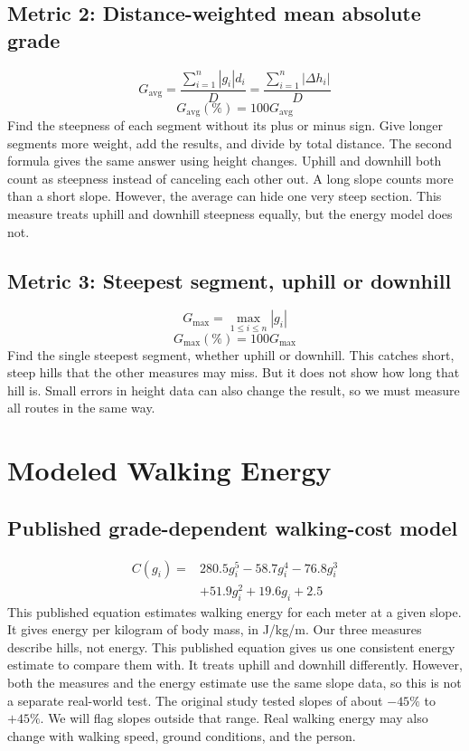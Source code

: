 \documentclass[11pt,letterpaper]{article}
\begin{document}
\subsection{Metric 2: Distance-weighted mean absolute grade}
\begin{equation}\boxed{G_{\mathrm{avg}}=\frac{\displaystyle\sum_{i=1}^{n}|g_i|d_i}{D}=\frac{\displaystyle\sum_{i=1}^{n}|\Delta h_i|}{D}}\end{equation}
\begin{equation}G_{\mathrm{avg}}(\%)=100G_{\mathrm{avg}}\end{equation}
Find the steepness of each segment without its plus or minus sign. Give longer segments more weight, add the results, and divide by total distance. The second formula gives the same answer using height changes. Uphill and downhill both count as steepness instead of canceling each other out. A long slope counts more than a short slope. However, the average can hide one very steep section. This measure treats uphill and downhill steepness equally, but the energy model does not.

\subsection{Metric 3: Steepest segment, uphill or downhill}
\begin{equation}\boxed{G_{\max}=\max_{1\leq i\leq n}|g_i|}\end{equation}
\begin{equation}G_{\max}(\%)=100G_{\max}\end{equation}
Find the single steepest segment, whether uphill or downhill. This catches short, steep hills that the other measures may miss. But it does not show how long that hill is. Small errors in height data can also change the result, so we must measure all routes in the same way.

\section{Modeled Walking Energy}
\subsection{Published grade-dependent walking-cost model}
\begin{equation}\boxed{\begin{aligned}C(g_i)={}&280.5g_i^5-58.7g_i^4-76.8g_i^3\\&+51.9g_i^2+19.6g_i+2.5\end{aligned}}\end{equation}
This published equation estimates walking energy for each meter at a given slope. It gives energy per kilogram of body mass, in J/kg/m. Our three measures describe hills, not energy. This published equation gives us one consistent energy estimate to compare them with. It treats uphill and downhill differently. However, both the measures and the energy estimate use the same slope data, so this is not a separate real-world test. The original study tested slopes of about $-45\%$ to $+45\%$. We will flag slopes outside that range. Real walking energy may also change with walking speed, ground conditions, and the person.
\end{document}

